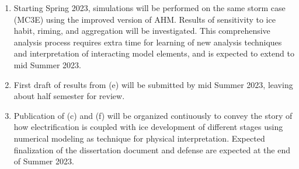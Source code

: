 \begin{enumerate}[label=(\alph*)]
    \item{Starting Spring 2023, simulations will be performed on the same storm case (MC3E) using the improved version of AHM. Results of sensitivity to ice habit, riming, and aggregation will be investigated. This comprehensive analysis process requires extra time for learning of new analysis techniques and interpretation of interacting model elements, and is expected to extend to mid Summer 2023.}
    \item{First draft of results from (e) will be submitted by mid Summer 2023, leaving about half semester for review.}
    \item{Publication of (c) and (f) will be organized contiuously to convey the story of how electrification is coupled with ice development of different stages using numerical modeling as technique for physical interpretation. Expected finalization of the dissertation document and defense are expected at the end of Summer 2023.}
\end{enumerate}